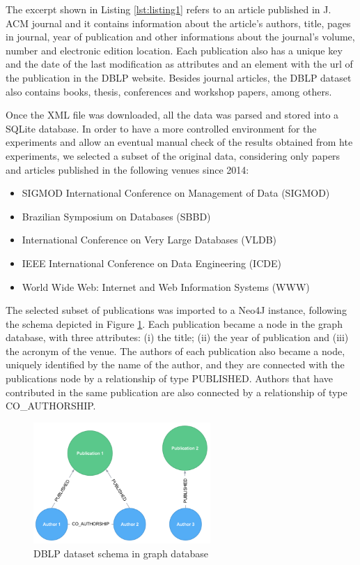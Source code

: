The excerpt shown in Listing  \ref{lst:listing1} refers to an article published in J. ACM journal and it contains information about the article's authors, title, pages in journal, year of publication and other informations about the journal's volume, number and electronic edition location. Each publication also has a unique key and the date of the last modification as attributes and an element with the url of the publication in the DBLP website. Besides journal articles, the DBLP dataset also contains books, thesis, conferences and workshop papers, among others.

Once the XML file was downloaded, all the data was parsed and stored into a SQLite database. In order to have a more controlled environment for the experiments and allow an eventual manual check of the results obtained from hte experiments, we selected a subset of the original data, considering only papers and articles published in the following venues since 2014:

\begin{itemize}
\item SIGMOD International Conference on Management of Data (SIGMOD)
\item Brazilian Symposium on Databases (SBBD)
\item International Conference on Very Large Databases (VLDB)
\item IEEE International Conference on Data Engineering (ICDE)
\item World Wide Web: Internet and Web Information Systems (WWW)
\end{itemize}

The selected subset of publications was imported to a Neo4J instance, following the schema depicted in Figure \ref{fig:figure32}. Each publication became a node in the graph database, with three attributes: (i) the title; (ii) the year of publication and (iii) the acronym of the venue. The authors of each publication also became a node, uniquely identified by the name of the author, and they are connected with the publications node by a relationship of type PUBLISHED. Authors that have contributed in the same publication are also connected by a relationship of type CO\_AUTHORSHIP.

\begin{figure}[ht]
\centering
\includegraphics[width=0.6\textwidth]{../dblp_schema.png}
\caption{DBLP dataset schema in graph database}
\label{fig:figure32}
\end{figure}

